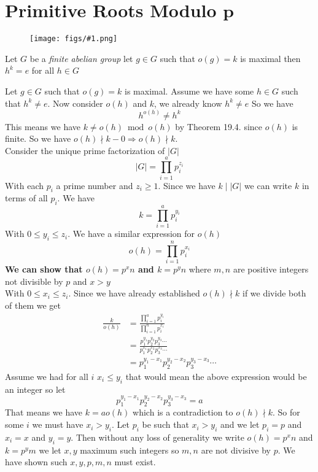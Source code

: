 \documentclass[16pt,a4paper]{article}
\theoremstyle{definition}
\newcommand{\fig}[2]{\begin{figure}[hbtp] 
 \centering
 \texttt{[image: figs/\#1.png]}
 \end{figure}
}
\begin{document}
\section*{Primitive Roots Modulo $\mathbf{p}$}
\fig{fig3}{0.3}
\begin{lemm}{}{}
Let $G$ be a \emph{finite abelian group} let $g\in G$ such that $o(g)=k$ is maximal then $h^k = e$ for all $h\in G$
\end{lemm}

Let $g\in G$ such that $o(g)=k$ is maximal. Assume we have some $h\in G$ such that $h^k \neq e$. Now consider $o(h)$ and $k$, we already know
$h^{k}\neq e$
So we have 
\[h^{o(h)}\neq h^k\]
This means we have $k\neq o(h) \bmod o(h)$ by Theorem 19.4. since $o(h)$ is finite. So we have $o(h)\nmid k-0 \Rightarrow o(h) \nmid k$. 
\\

Consider the unique prime factorization of $|G|$
\[
|G| =\prod_{i=1}^a p_i^{z_i}
\]
With each $p_i$ a prime number and $z_i\geq 1$. Since we have $k\mid |G|$ we can write $k$ in terms of all $p_i$. We have 
\[
k = \prod_{i=1}^a p_i^{y_i}
\] 
With $0\leq y_i \leq z_i$. We have a similar expression for $o(h)$
\[
o(h) = \prod_{i=1}^n p_i^{x_i}
\]
\textbf{ We can show that $o(h)=p^xn$ and $k = p^yn$} where $m,n$ are positive integers not divisible by $p$ and $x>y$ 
\\

With $0\leq x_i \leq z_i$. Since we have already established $o(h)\nmid k$ if we divide both of them we get 
\begin{align*}
\frac{k}{o(h)} &= \frac{\prod_{i=1}^a p_i^{y_i}}{ \prod_{i=1}^n p_i^{x_i}}\\
 &= \frac{p_1^{y_1}p_2^{y_2}p_{3}^{y_3}\cdots}{p_1^{x_1}p_2^{x_2}p_{3}^{x_3}\cdots}\\
 &= p_1^{y_1-x_1}p_2^{y_2-x_2}p_{3}^{y_3-x_3}\cdots
\end{align*}
Assume we had for all $i$ $x_i\leq y_i$ that would mean the above expression would be an integer so let 
\[p_1^{y_1-x_1}p_2^{y_2-x_2}p_{3}^{y_3-x_3} = a\]
That means we have $k=a o(h)$ which is a contradiction to $o(h)\nmid k$. So for some $i$ we must have $x_i>y_i$. Let $p_i$ be such that $x_i > y_i$ and we let $p_i = p$ and $x_i = x$ and $y_i = y$. Then without any loss of generality we write $o(h) = p^xn$ and $k = p^ym$ we let $x,y$ maximum such integers so $m,n$ are not divisive by $p$. We have shown such $x,y,p,m,n$ must exist. 
\end{document}
